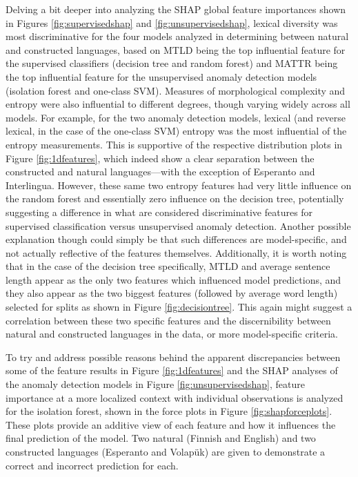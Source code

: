 \documentclass[12pt,a4paper]{article}
\numberwithin{figure}{section}
\numberwithin{table}{section}
\numberwithin{definition}{section}
\begin{document}
Delving a bit deeper into analyzing the SHAP global feature importances shown in Figures \ref{fig:supervisedshap} and \ref{fig:unsupervisedshap}, lexical diversity was most discriminative for the four models analyzed in determining between natural and constructed languages, based on MTLD being the top influential feature for the supervised classifiers (decision tree and random forest) and MATTR being the top influential feature for the unsupervised anomaly detection models (isolation forest and one-class SVM). Measures of morphological complexity and entropy were also influential to different degrees, though varying widely across all models. For example, for the two anomaly detection models, lexical (and reverse lexical, in the case of the one-class SVM) entropy was the most influential of the entropy measurements. This is supportive of the respective distribution plots in Figure \ref{fig:1dfeatures}, which indeed show a clear separation between the constructed and natural languages---with the exception of Esperanto and Interlingua. However, these same two entropy features had very little influence on the random forest and essentially zero influence on the decision tree, potentially suggesting a difference in what are considered discriminative features for supervised classification versus unsupervised anomaly detection. Another possible explanation though could simply be that such differences are model-specific, and not actually reflective of the features themselves. Additionally, it is worth noting that in the case of the decision tree specifically, MTLD and average sentence length appear as the only two features which influenced model predictions, and they also appear as the two biggest features (followed by average word length) selected for splits as shown in Figure \ref{fig:decisiontree}. This again might suggest a correlation between these two specific features and the discernibility between natural and constructed languages in the data, or more model-specific criteria.

To try and address possible reasons behind the apparent discrepancies between some of the feature results in Figure \ref{fig:1dfeatures} and the SHAP analyses of the anomaly detection models in Figure \ref{fig:unsupervisedshap}, feature importance at a more localized context with individual observations is analyzed for the isolation forest, shown in the force plots in Figure \ref{fig:shapforceplots}. These plots provide an additive view of each feature and how it influences the final prediction of the model. Two natural (Finnish and English) and two constructed languages (Esperanto and Volapük) are given to demonstrate a correct and incorrect prediction for each.
\end{document}
